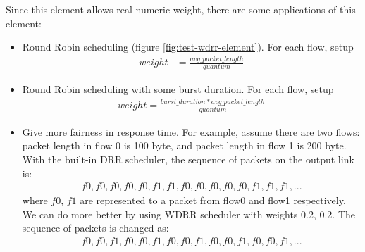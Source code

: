 \documentclass[a4paper]{article}
\begin{document}
  Since this element allows real numeric weight, there are some applications of this element:
  \begin{itemize}
  	\item Round Robin scheduling (figure \ref{fig:test-wdrr-element}). For each flow, setup
  	\begin{align*}weight &= \frac{avg\_packet\_length}{quantum}\end{align*}
  	\item Round Robin scheduling with some burst duration. For each flow, setup 
  	\begin{align*}weight = \frac{burst\_duration*avg\_packet\_length}{quantum}\end{align*}
  	\item Give more fairness in response time. For example, assume there are two flows: packet length in flow 0 is 100 byte, and packet length in flow 1 is 200 byte. With the built-in DRR scheduler, the sequence of packets on the output link is:
  	  \begin{align*}f0, f0, f0, f0, f0, f1, f1, f0, f0, f0, f0, f0, f1, f1, f1, ... \end{align*}
  	where $f0$, $f1$ are represented to a packet from flow0 and flow1 respectively. We can do more better by using WDRR scheduler with weights 0.2, 0.2. The sequence of packets is changed as:
  	  \begin{align*}f0, f0, f1, f0, f0, f1, f0, f0, f1, f0, f0, f1, f0, f0, f1, ... \end{align*}  	 
  \end{itemize}
  
\end{document}
